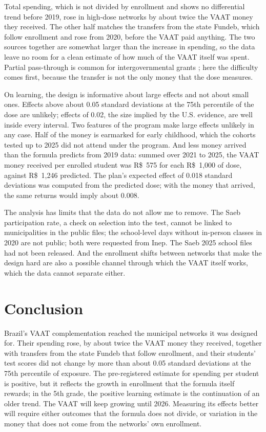 \documentclass[12pt,letterpaper]{article}
\newcommand{\reais}{R\$}
\begin{document}
Total spending, which is not divided by enrollment and shows no differential trend before 2019, rose in high-dose networks by about twice the VAAT money they received. The other half matches the transfers from the state Fundeb, which follow enrollment and rose from 2020, before the VAAT paid anything. The two sources together are somewhat larger than the increase in spending, so the data leave no room for a clean estimate of how much of the VAAT itself was spent. Partial pass-through is common for intergovernmental grants \citep{hines1995,gordon2004}; here the difficulty comes first, because the transfer is not the only money that the dose measures.

On learning, the design is informative about large effects and not about small ones. Effects above about 0.05 standard deviations at the 75th percentile of the dose are unlikely; effects of 0.02, the size implied by the U.S. evidence, are well inside every interval. Two features of the program make large effects unlikely in any case. Half of the money is earmarked for early childhood, which the cohorts tested up to 2025 did not attend under the program. And less money arrived than the formula predicts from 2019 data: summed over 2021 to 2025, the VAAT money received per enrolled student was \reais{}~575 for each \reais{}~1,000 of dose, against \reais{}~1,246 predicted. The plan's expected effect of 0.018 standard deviations was computed from the predicted dose; with the money that arrived, the same returns would imply about 0.008.

The analysis has limits that the data do not allow me to remove. The Saeb participation rate, a check on selection into the test, cannot be linked to municipalities in the public files; the school-level days without in-person classes in 2020 are not public; both were requested from Inep. The Saeb 2025 school files had not been released. And the enrollment shifts between networks that make the design hard are also a possible channel through which the VAAT itself works, which the data cannot separate either.

\section{Conclusion}\label{sec:conclusao}

Brazil's VAAT complementation reached the municipal networks it was designed for. Their spending rose, by about twice the VAAT money they received, together with transfers from the state Fundeb that follow enrollment, and their students' test scores did not change by more than about 0.05 standard deviations at the 75th percentile of exposure. The pre-registered estimate for spending per student is positive, but it reflects the growth in enrollment that the formula itself rewards; in the 5th grade, the positive learning estimate is the continuation of an older trend. The VAAT will keep growing until 2026. Measuring its effects better will require either outcomes that the formula does not divide, or variation in the money that does not come from the networks' own enrollment.
\end{document}
